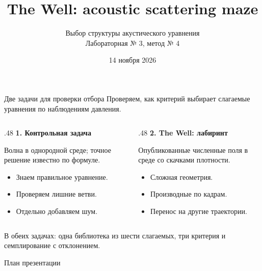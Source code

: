 \documentclass{beamer}
\title{The Well: acoustic scattering maze}
\subtitle{Выбор структуры акустического уравнения\\Лабораторная № 3, метод № 4}
\author{}\institute{Foundation models for spatial-time series}\date{14 ноября 2026}
\begin{document}
\begin{frame}\maketitle\end{frame}

\begin{frame}{Две задачи для проверки отбора}\small
Проверяем, как критерий выбирает слагаемые уравнения по наблюдениям давления.
\medskip
\begin{columns}[T]
\begin{column}{.48\textwidth}
\textbf{1. Контрольная задача}\par\medskip
Волна в однородной среде; точное решение известно по формуле.
\begin{itemize}
\item Знаем правильное уравнение.
\item Проверяем лишние ветви.
\item Отдельно добавляем шум.
\end{itemize}
\end{column}
\begin{column}{.48\textwidth}
\textbf{2. The Well: лабиринт}\par\medskip
Опубликованные численные поля в среде со скачками плотности.
\begin{itemize}
\item Сложная геометрия.
\item Производные по кадрам.
\item Перенос на другие траектории.
\end{itemize}
\end{column}
\end{columns}
\medskip
\footnotesize В обеих задачах: одна библиотека из шести слагаемых,
три критерия и семплирование с отклонением.
\end{frame}

\begin{frame}{План презентации}
\tableofcontents[hideallsubsections]
\end{frame}
\end{document}
